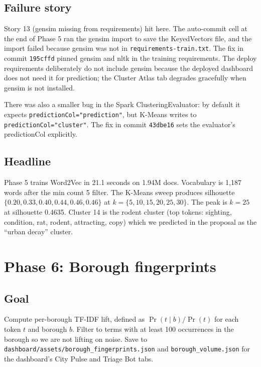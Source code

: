 \documentclass[11pt,letterpaper]{book}
\begin{document}
\subsection*{Failure story}

Story 13 (gensim missing from requirements) hit here. The auto-commit cell at the end of Phase 5 ran the gensim import to save the KeyedVectors file, and the import failed because gensim was not in \texttt{requirements-train.txt}. The fix in commit \texttt{195cffd} pinned gensim and nltk in the training requirements. The deploy requirements deliberately do not include gensim because the deployed dashboard does not need it for prediction; the Cluster Atlas tab degrades gracefully when gensim is not installed.

There was also a smaller bug in the Spark ClusteringEvaluator: by default it expects \texttt{predictionCol="prediction"}, but K-Means writes to \texttt{predictionCol="cluster"}. The fix in commit \texttt{43dbe16} sets the evaluator's predictionCol explicitly.

\subsection*{Headline}

Phase 5 trains Word2Vec in 21.1 seconds on 1.94M docs. Vocabulary is 1,187 words after the min count 5 filter. The K-Means sweep produces silhouette $\{0.20, 0.33, 0.40, 0.44, 0.46, 0.46\}$ at $k = \{5, 10, 15, 20, 25, 30\}$. The peak is $k = 25$ at silhouette 0.4635. Cluster 14 is the rodent cluster (top tokens: sighting, condition, rat, rodent, attracting, copy) which we predicted in the proposal as the ``urban decay'' cluster.

\section{Phase 6: Borough fingerprints}
\label{sec:phase6}

\subsection*{Goal}

Compute per-borough TF-IDF lift, defined as $\Pr(t \mid b) / \Pr(t)$ for each token $t$ and borough $b$. Filter to terms with at least 100 occurrences in the borough so we are not lifting on noise. Save to \texttt{dashboard/assets/borough\_fingerprints.json} and \texttt{borough\_volume.json} for the dashboard's City Pulse and Triage Bot tabs.
\end{document}
